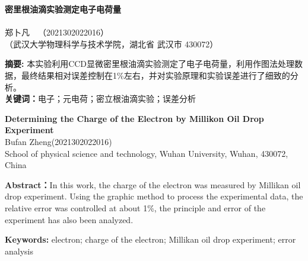 \documentclass{WHUReport}
\newcommand{\name}{郑卜凡}
\newcommand{\stuid}{2021302022016}
\newcommand{\Name}{Bufan Zheng}
\newcommand{\newtitle}{密里根油滴实验测定电子电荷量}
\newcommand{\Title}{Determining the Charge of the Electron by Millikon Oil Drop Experiment}
\begin{document}
\pagestyle{maincontent} 
%

\begin{center}
 \textbf{\newtitle}\\
~\\
 \kaishu \name \ \ （\stuid）\\
 \kaishu （武汉大学物理科学与技术学院，湖北省 武汉市 430072）\\
\end{center}
\textbf{摘\quad 要:}
本实验利用CCD显微密里根油滴实验测定了电子电荷量，利用作图法处理数据，最终结果相对误差控制在1\%左右，并对实验原理和实验误差进行了细致的分析。\\
\textbf{关键词：}电子；元电荷；密立根油滴实验；误差分析
~\\
\begin{center}
	\textbf{\Title}\\
	 \Name\quad (\stuid)\\
	 School of physical science and technology, Wuhan University, Wuhan, 430072, China
\end{center}

\textbf{Abstract：}In this work, the charge of the electron was measured by Millikan oil drop experiment. Using the graphic method to process the experimental data, the relative error was controlled at about 1\%, the principle and error of the experiment has also been analyzed.

\textbf{Keywords: }electron; charge of the electron; Millikan oil drop experiment; error analysis
\end{document}
